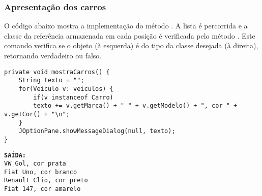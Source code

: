 \subsubsection{Apresentação dos carros}

O código abaixo mostra a implementação do método . A lista é percorrida e a classe da referência armazenada em cada posição é verificada pelo método . Este comando verifica se o objeto (à esquerda) é do tipo da classe desejada (à direita), retornando verdadeiro ou falso.

\begin{verbatim}
private void mostraCarros() {
	String texto = "";
	for(Veiculo v: veiculos) {
		if(v instanceof Carro)
		texto += v.getMarca() + " " + v.getModelo() + ", cor " + v.getCor() + "\n";
	}
	JOptionPane.showMessageDialog(null, texto);
}
\end{verbatim}

\begin{minipage}{\textwidth}
	\textbf{\texttt{SAÍDA:}}\\
	\texttt{VW Gol, cor prata}\\
	\texttt{Fiat Uno, cor branco}\\
	\texttt{Renault Clio, cor preto}\\
	\texttt{Fiat 147, cor amarelo}
\end{minipage}